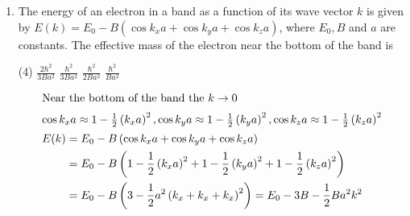 \begin{enumerate}
	{}
	\begin{tasks}(4)
		\task[\textbf{A.}] $1 / \sqrt{E}$
		\task[\textbf{B.}] $\sqrt{E}$
		\task[\textbf{C.}] $E$
		\task[\textbf{D.}] constant
	\end{tasks}
	\begin{answer}
		\begin{align*}
		\intertext{In two dimensional system, the number of allowed $k$-states in range $k$ and $k+d k$ is}
		g(k) d k&=\left(\frac{L}{2 \pi}\right)^{2} 2 \pi k d k\\
		\text{Given dispersion relation is }E&=u \hbar k \therefore k=\frac{E}{u \hbar} \Rightarrow d k=\frac{d E}{u \hbar}\\
		\therefore g(E) d E&=\left(\frac{L}{2 \pi}\right)^{2} 2 \pi \times \frac{E}{u \hbar} \times \frac{d E}{u \hbar}=\left(\frac{L}{2 \pi}\right)^{2} \frac{2 \pi}{(u \hbar)^{2}} E d E\\
		\Rightarrow \rho(E)&=\frac{g(E) d E}{d E}=\frac{1}{(u \hbar)^{2}} \frac{L^{2}}{2 \pi} E
		\end{align*}
		So the correct answer is \textbf{Option (C)}
	\end{answer}
	\item The energy of an electron in a band as a function of its wave vector $k$ is given by $E(k)=E_{0}-B\left(\cos k_{x} a+\cos k_{y} a+\cos k_{z} a\right)$, where $E_{0}, B$ and $a$ are constants. The effective mass of the electron near the bottom of the band is
	{}
	\begin{tasks}(4)
		\task[\textbf{A.}] $\frac{2 \hbar^{2}}{3 B a^{2}}$
		\task[\textbf{B.}] $\frac{\hbar^{2}}{3 B a^{2}}$
		\task[\textbf{C.}] $\frac{\hbar^{2}}{2 B a^{2}}$
		\task[\textbf{D.}] $\frac{\hbar^{2}}{B a^{2}}$
	\end{tasks}
	\begin{answer}
		\begin{align*}
		\intertext{Near the bottom of the band the $k \rightarrow 0$}
		\intertext{$\cos k_{x} a \approx 1-\frac{1}{2}\left(k_{x} a\right)^{2}, \cos k_{y} a \approx 1-\frac{1}{2}\left(k_{y} a\right)^{2}, \cos k_{z} a \approx 1-\frac{1}{2}\left(k_{z} a\right)^{2}$}
		E(k)&=E_{0}-B\left(\cos k_{x} a+\cos k_{y} a+\cos k_{z} a\right)\\&=E_{0}-B\left(1-\frac{1}{2}\left(k_{x} a\right)^{2}+1-\frac{1}{2}\left(k_{y} a\right)^{2}+1-\frac{1}{2}\left(k_{z} a\right)^{2}\right)\\
		&=E_{0}-B\left(3-\frac{1}{2} a^{2}\left(k_{x}+k_{x}+k_{x}\right)^{2}\right)=E_{0}-3 B-\frac{1}{2} B a^{2} k^{2}\\

\end{align*}
\end{answer}
\end{enumerate}

